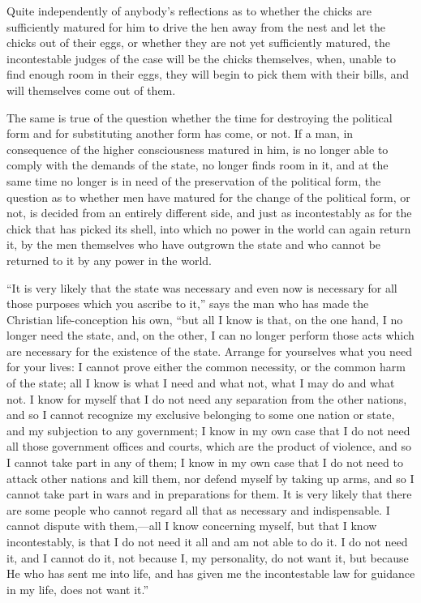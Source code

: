 \documentclass{book}
\begin{document}
Quite independently of anybody’s reflections as to whether the chicks are sufficiently matured for him to drive the hen away from the nest and let the chicks out of their eggs, or whether they are not yet sufficiently matured, the incontestable judges of the case will be the chicks themselves, when, unable to find enough room in their eggs, they will begin to pick them with their bills, and will themselves come out of them.

The same is true of the question whether the time for destroying the political form and for substituting another form has come, or not. If a man, in consequence of the higher consciousness matured in him, is no longer able to comply with the demands of the state, no longer finds room in it, and at the same time no longer is in need of the preservation of the political form, the question as to whether men have matured for the change of the political form, or not, is decided from an entirely different side, and just as incontestably as for the chick that has picked its shell, into which no power in the world can again return it, by the men themselves who have outgrown the state and who cannot be returned to it by any power in the world.

“It is very likely that the state was necessary and even now is necessary for all those purposes which you ascribe to it,” says the man who has made the Christian life-conception his own, “but all I know is that, on the one hand, I no longer need the state, and, on the other, I can no longer perform those acts which are necessary for the existence of the state. Arrange for yourselves what you need for your lives: I cannot prove either the common necessity, or the common harm of the state; all I know is what I need and what not, what I may do and what not. I know for myself that I do not need any separation from the other nations, and so I cannot recognize my exclusive belonging to some one nation or state, and my subjection to any government; I know in my own case that I do not need all those government offices and courts, which are the product of violence, and so I cannot take part in any of them; I know in my own case that I do not need to attack other nations and kill them, nor defend myself by taking up arms, and so I cannot take part in wars and in preparations for them. It is very likely that there are some people who cannot regard all that as necessary and indispensable. I cannot dispute with them,—all I know concerning myself, but that I know incontestably, is that I do not need it all and am not able to do it. I do not need it, and I cannot do it, not because I, my personality, do not want it, but because He who has sent me into life, and has given me the incontestable law for guidance in my life, does not want it.”
\end{document}
